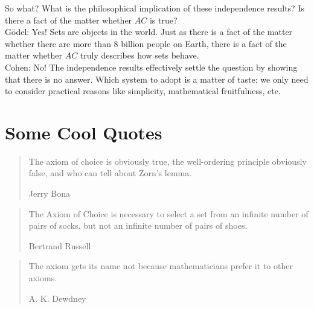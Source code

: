 \documentclass[11pt]{article}
\theoremstyle{definition}
\begin{document}
So what? What is the philosophical implication of these independence results? Is there a fact of the matter whether $AC$ is true? \\


Gödel: Yes! Sets are objects in the world. Just as there is a fact of the matter whether there are more than $8$ billion people on Earth, there is a fact of the matter whether $AC$ truly describes how sets behave.  \\


Cohen: No! The independence results effectively settle the question by showing that there is no answer. Which system to adopt is a matter of taste: we only need to consider practical reasons like simplicity, mathematical fruitfulness, etc.

\section{Some Cool Quotes}

\begin{quote}
The axiom of choice is obviously true, the well-ordering principle obviously false, and who can tell about Zorn's lemma.
\begin{flushright}
    Jerry Bona
\end{flushright}
\end{quote}

\begin{quote}
The Axiom of Choice is necessary to select a set from an infinite number of pairs of socks, but not an infinite number of pairs of shoes.
\begin{flushright}
   Bertrand Russell
\end{flushright}
\end{quote}

\begin{quote}
The axiom gets its name not because mathematicians prefer it to other axioms.
\begin{flushright}
   A. K. Dewdney
\end{flushright}
\end{quote}
\end{document}
